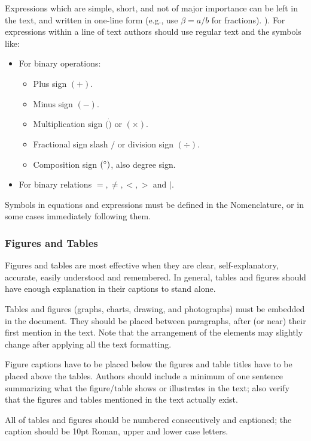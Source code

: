 \documentclass{ECOS_2021}
\begin{document}
Expressions which are simple, short, and not of major importance can be left in the text, and written in one-line form (e.g., use $\beta = a/b$ for fractions). ). For expressions within a line of text authors should use regular text and the symbols like:
\begin{itemize}
    \item For binary operations:
    \begin{itemize}
        \item Plus sign $(+)$.
        \item Minus sign $(-)$.
        \item Multiplication sign $(\dot)$ or $(\times)$.
        \item Fractional sign slash $/$ or division sign $(\div)$.
        \item Composition sign $(\degree)$, also degree sign.
    \end{itemize}
    \item For binary relations $=,\neq,<,>$ and $|$.
\end{itemize}

Symbols in equations and expressions must be defined in the Nomenclature, or in some cases immediately following them.

\sffamily \subsubsection{Figures and Tables} \label{Figures and Tables}
\rmfamily
Figures and tables are most effective when they are clear, self-explanatory, accurate, easily understood and remembered. In general, tables and figures should have enough explanation in their captions to stand alone.

Tables and figures (graphs, charts, drawing, and photographs) must be embedded in the document. They should be placed between paragraphs, after (or near) their first mention in the text. Note that the arrangement of the elements may slightly change after applying all the text formatting.

Figure captions have to be placed below the figures and table titles have to be placed above the tables. Authors should include a minimum of one sentence summarizing what the figure/table shows or illustrates in the text; also verify that the figures and tables mentioned in the text actually exist.

All of tables and figures should be numbered consecutively and captioned; the caption should be 10pt Roman, upper and lower case letters.
\end{document}
